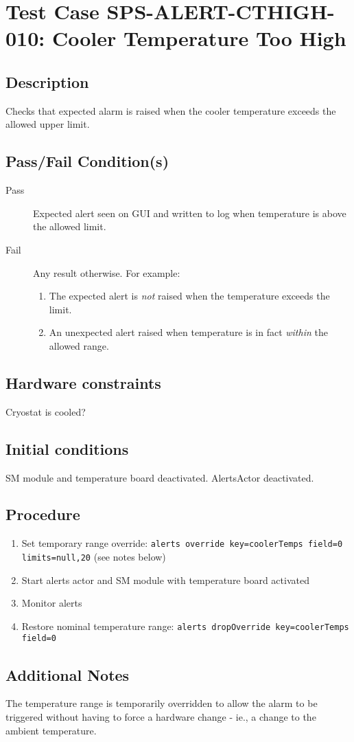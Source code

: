 \section{Test Case SPS-ALERT-CTHIGH-010: Cooler Temperature Too High}

\subsection{Description}

Checks that expected alarm is raised when the cooler temperature exceeds the allowed upper limit.

\subsection{Pass/Fail Condition(s)}

\begin{description}
\item [Pass] Expected alert seen on GUI and written to log when temperature is above the allowed limit.
\item [Fail] Any result otherwise. For example:

\begin{enumerate}
    \item The expected alert is {\it not} raised when the temperature exceeds the limit.
    \item An unexpected alert raised when temperature is in fact {\it within} the allowed range.
\end{enumerate}
\end{description}

\subsection{Hardware constraints}

Cryostat is cooled?

\subsection{Initial conditions}

SM module and temperature board deactivated. AlertsActor deactivated.

\subsection{Procedure}
\label{sec:alerts-proc}

\begin{enumerate}
    \item Set temporary range override: \texttt{alerts override key=coolerTemps field=0 limits=null,20} 
    (see notes below)
    \item Start alerts actor and SM module with temperature board activated
    \item Monitor alerts
    \item Restore nominal temperature range: \texttt{alerts dropOverride key=coolerTemps field=0}
\end{enumerate}

\subsection{Additional Notes}
The temperature range is temporarily overridden to allow the alarm to be triggered without 
having to force a hardware change - ie., a change to the ambient temperature.
